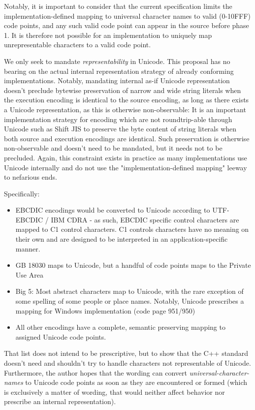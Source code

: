 \documentclass{wg21}
\begin{document}
Notably, it is important to consider that the current specification limits the implementation-defined mapping to universal character names to  valid (0-10FFF) code points,
and any such valid code point can appear in the source before phase 1.
It is therefore not possible for an implementation to uniquely map unrepresentable characters to a valid code point.

We only seek to mandate \emph{representability} in Unicode.
This proposal has no bearing on the actual internal representation strategy of already conforming implementations. Notably, mandating internal as-if Unicode representation doesn't
preclude bytewise preservation of narrow and wide string literals when the execution encoding is identical to the source encoding,  as long as there exists a Unicode representation,
as this is otherwise non-observable: It is an important implementation strategy for encoding which are not roundtrip-able through Unicode such as Shift JIS 
to preserve the byte content of string literals when both source and execution encodings are identical.
Such preservation is otherwise non-observable and doesn't need to be mandated, but it needs not to be precluded.
Again, this constraint exists in practice as many implementations use Unicode internally and do not use the "implementation-defined mapping" leeway
to nefarious ends.


Specifically:
\begin{itemize}
    \item EBCDIC encodings would be converted to Unicode according to UTF-EBCDIC / IBM CDRA - as such, EBCDIC specific control characters are mapped to C1 control characters. C1 controls characters have no meaning on their own and are designed to be interpreted in an application-specific manner.
    \item GB 18030 maps to Unicode, but a handful of code points maps to the Private Use Area
    \item Big 5: Most abstract characters map to Unicode, with the rare exception of some spelling of some people or place names. Notably, Unicode prescribes a mapping for Windows implementation (code page 951/950)
    \item All other encodings have a complete, semantic preserving mapping to assigned Unicode code points.
\end{itemize}

That list does not intend to be prescriptive, but to show that the C++ standard doesn't need and shouldn't try to handle characters not representable of Unicode.
Furthermore, the author hopes that the wording can convert \emph{universal-character-names} to Unicode code points as soon as they are encountered or formed (which is exclusively a matter of wording,
that would neither affect behavior nor prescribe an internal representation). 
\end{document}

